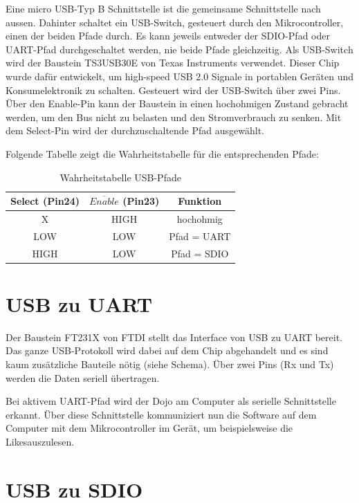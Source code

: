 Eine micro USB-Typ B Schnittstelle ist die gemeinsame Schnittstelle nach aussen. Dahinter schaltet ein USB-Switch, gesteuert durch den Mikrocontroller, einen der beiden Pfade durch. Es kann jeweils entweder der SDIO-Pfad oder UART-Pfad durchgeschaltet werden, nie beide Pfade gleichzeitig.\newline
Als USB-Switch wird der Baustein TS3USB30E von Texas Instruments verwendet. Dieser Chip wurde dafür entwickelt, um high-speed USB 2.0 Signale in portablen Geräten und Konsumelektronik zu schalten. Gesteuert wird der USB-Switch über zwei Pins. Über den Enable-Pin kann der Baustein in einen hochohmigen Zustand gebracht werden, um den Bus nicht zu belasten und den Stromverbrauch zu senken. Mit dem Select-Pin wird der durchzuschaltende Pfad ausgewählt.

Folgende Tabelle zeigt die Wahrheitstabelle für die entsprechenden Pfade:
\begin{table}[h]
	\centering
	\begin{tabular}{|c|c|c|} 
		Select (Pin24) & $\overline{Enable}$ (Pin23) & Funktion \\ 
		\hline 
		X & HIGH & hochohmig \\ 
		\hline 
		LOW & LOW & Pfad = UART \\ 
		\hline 
		HIGH & LOW & Pfad = SDIO \\ 
	\end{tabular} 
	\caption{Wahrheitstabelle USB-Pfade}
	\label{truth_table_usb}
\end{table}

\section{USB zu UART}

Der Baustein FT231X von FTDI stellt das Interface von USB zu UART bereit. Das ganze USB-Protokoll wird dabei auf dem Chip abgehandelt und es sind kaum zusätzliche Bauteile nötig (siehe Schema). Über zwei Pins (Rx und Tx) werden die Daten seriell übertragen.

Bei aktivem UART-Pfad wird der Dojo am Computer als serielle Schnittstelle erkannt. Über diese Schnittstelle kommuniziert nun die Software auf dem Computer mit dem Mikrocontroller im Gerät, um beispielsweise die \flq Likes\frq  auszulesen.


\section{USB zu SDIO}


